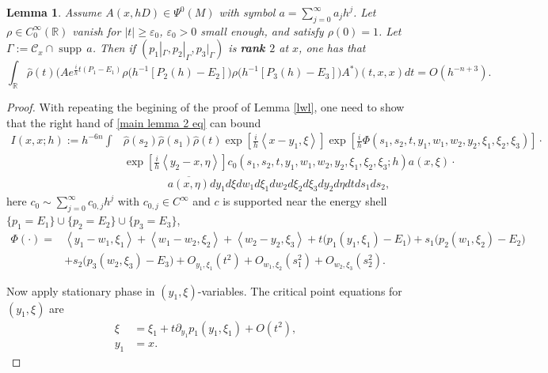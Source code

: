 \documentclass[10pt,a4paper]{amsart}
\newtheorem{lem}{Lemma}
\renewcommand{\epsilon}{\varepsilon}
\newcommand{\supp}{{\operatorname{supp\,}}}
\begin{document}
\begin{lem}\label{lwl 2}
Assume $A(x, hD)\in \Psi^0(M)$ with symbol $a=\sum_{j=0}^\infty a_j h^j$. Let $\rho\in C_0^\infty(\mathbb{R})$ vanish for $|t|\geq \epsilon_0$, $\epsilon_0>0$ small enough, and satisfy $\rho(0)=1$. Let $\Gamma:=\mathcal{C}_x\cap \supp a$. Then if $(p_1|_\Gamma, p_2|_\Gamma, p_3|_\Gamma)$ is {\bf rank $2$} at $x$, one has that
\begin{equation}\label{main lemma 2 eq}
\int_{\mathbb{R}} \hat{\rho}(t) \big(A e^{\frac{i}h t(P_1-E_1)}  \rho\big(h^{-1}[P_2(h)-E_2]\big)\rho\big(h^{-1}[P_3(h)-E_3]\big)  A^*\big)(t,x,x) dt =O(h^{-n+3}).
\end{equation}
\end{lem}

\begin{proof}
With repeating the begining of the proof of Lemma \ref{lwl}, one need to show that the right hand of \eqref{main lemma 2 eq} can bound
\begin{align}
I(x,x;h):=h^{- 6n}\int &\hat{\rho}(s_2)\hat{\rho}(s_1)\hat{\rho}(t) \exp[\frac{i}h \left<x-y_1, \xi\right>] \exp[\frac{i}h \Phi(s_1, s_2,t,y_1, w_1, w_2, y_2, \xi_1, \xi_2, \xi_3)]\cdot  \nonumber \\
& \exp[\frac{i}h \left<y_2-x, \eta\right>] c_0(s_1, s_2,t,y_1,w_1,w_2,y_2,\xi_1,\xi_2,\xi_3;h) a(x, \xi) \cdot \nonumber \\
 &\qquad\qquad \overline{a(x, \eta)} dy_1 d\xi dw_1 d\xi_1 dw_2 d\xi_2 d\xi_3 dy_2 d\eta dt ds_1 ds_2,
\end{align}
here $c_0\sim \sum_{j=0}^\infty c_{0,j} h^j$ with $c_{0,j}\in C^\infty$ and $c$ is supported near the energy shell $\{p_1=E_1\}\cup\{p_2=E_2\}\cup\{p_3=E_3\}$, 
\begin{align*}
\Phi(\cdot)=&\left<y_1-w_1,\xi_1 \right>+\left<w_1-w_2, \xi_2\right>+\left<w_2-y_2, \xi_3\right> +t\big(p_1(y_1,\xi_1)-E_1\big)+s_1\big( p_2(w_1,\xi_2)-E_2 \big)\nonumber \\
&+s_2\big( p_3(w_2,\xi_3)-E_3 \big)+O_{y_1,\xi_1}(t^2)+O_{w_1,\xi_2}(s_1^2)+O_{w_2,\xi_3}(s_2^2).
\end{align*}

Now apply stationary phase in $(y_1, \xi)$-variables. The critical point equations for $(y_1, \xi)$ are
\begin{align}
\xi&=\xi_1+ t\partial_{y_1} p_1(y_1,\xi_1)+ O(t^2), \\
y_1&=x.
\end{align}


\end{proof}
\end{document}
